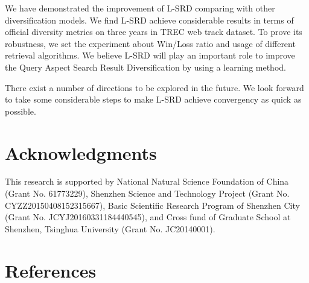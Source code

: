 \documentclass[review]{elsarticle}
\begin{document}
We have demonstrated the improvement of L-SRD comparing with other diversification models. We find L-SRD achieve considerable results in terms of official diversity metrics on three years in TREC web track dataset. To prove its robustness, we set the experiment about Win/Loss ratio and usage of different retrieval algorithms. We believe L-SRD will play an important role to improve the Query Aspect Search Result Diversification by using a learning method.

There exist a number of directions to be explored in the future. We look forward to take some considerable steps to make L-SRD achieve convergency as quick as possible. %

\section{Acknowledgments}


This research is supported by National Natural Science Foundation of China (Grant No. 61773229), Shenzhen Science and Technology Project (Grant No. CYZZ20150408152315667), Basic Scientific Research Program of Shenzhen City (Grant No. JCYJ20160331184440545), and Cross fund of Graduate School at Shenzhen, Tsinghua University (Grant No. JC20140001).


\section*{References}
%
%

\end{document}
